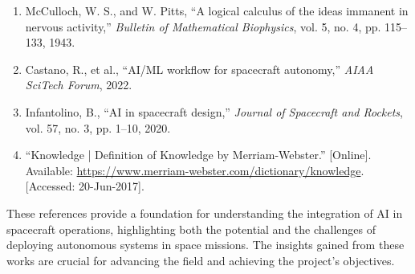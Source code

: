 \documentclass[a4paper, 11pt]{article}
\begin{document}
\begin{enumerate}
    \item McCulloch, W. S., and W. Pitts, “A logical calculus of the ideas immanent in nervous activity,” \textit{Bulletin of Mathematical Biophysics}, vol. 5, no. 4, pp. 115–133, 1943.
    
    \item Castano, R., et al., “AI/ML workflow for spacecraft autonomy,” \textit{AIAA SciTech Forum}, 2022.
    
    \item Infantolino, B., “AI in spacecraft design,” \textit{Journal of Spacecraft and Rockets}, vol. 57, no. 3, pp. 1–10, 2020.
    
    \item “Knowledge | Definition of Knowledge by Merriam-Webster.” [Online]. Available: \url{https://www.merriam-webster.com/dictionary/knowledge}. [Accessed: 20-Jun-2017].
\end{enumerate}

These references provide a foundation for understanding the integration of AI in spacecraft operations, highlighting both the potential and the challenges of deploying autonomous systems in space missions. The insights gained from these works are crucial for advancing the field and achieving the project's objectives.
\end{document}
